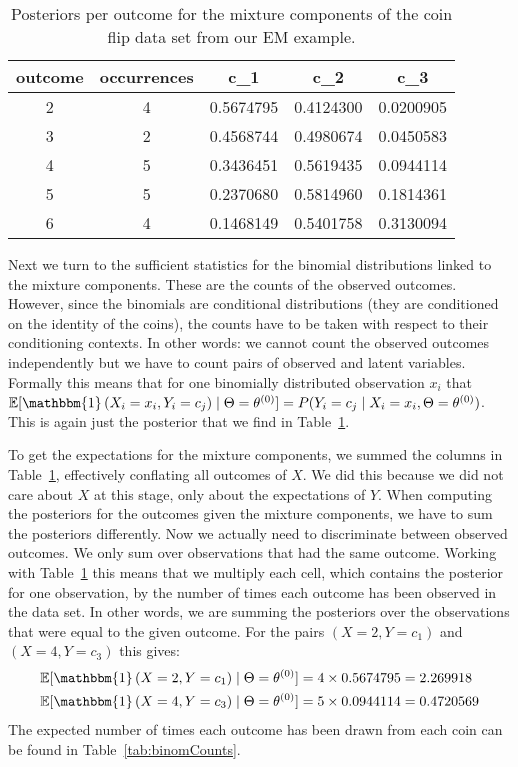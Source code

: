 \documentclass[a4paper,11pt,leqno]{report}\usepackage[]{graphicx}\usepackage[]{color}
\newcommand{\E}{\mathbb{E}}
\newcommand{\id}[1]{\mathbbm{1}\left(#1\right)}
\begin{document}
\begin{table}
\center

\begin{tabular}{c|c|c|c|c}
\hline
outcome & occurrences & c\_1 & c\_2 & c\_3\\
\hline
2 & 4 & 0.5674795 & 0.4124300 & 0.0200905\\
\hline
3 & 2 & 0.4568744 & 0.4980674 & 0.0450583\\
\hline
4 & 5 & 0.3436451 & 0.5619435 & 0.0944114\\
\hline
5 & 5 & 0.2370680 & 0.5814960 & 0.1814361\\
\hline
6 & 4 & 0.1468149 & 0.5401758 & 0.3130094\\
\hline
\end{tabular}


\caption{Posteriors per outcome for the mixture components of the coin flip data set from our EM example.}
\label{tab:posteriors}
\end{table}

Next we turn to the sufficient statistics for the binomial distributions linked to the mixture components. These are the counts of the observed outcomes. However,
since the binomials are conditional distributions (they are conditioned on the identity of the coins), the counts have to be taken with respect to their conditioning
contexts. In other words: we cannot count the observed outcomes independently but we have to count pairs of observed and latent variables. Formally this means that 
for one binomially distributed observation $ x_{i} $ that $ \E[\id{X_{i}=x_{i},Y_{i}=c_{j}} \mid \Theta=\theta^{(0)}] = P(Y_{i}=c_{j} \mid X_{i}=x_{i}, \Theta=\theta^{(0)}) $. This is again
just the posterior that we find in Table~\ref{tab:posteriors}. 

To get the expectations for the mixture components, we summed the columns in Table~\ref{tab:posteriors}, effectively conflating all outcomes of $ X $. We did this
because we did not care about $ X $ at this stage, only about the expectations of $ Y $. When computing the posteriors for the outcomes given the mixture components,
we have to sum the posteriors differently. Now we actually need to discriminate between
observed outcomes. We only sum over observations that had the same outcome. Working with Table~\ref{tab:posteriors} this means that we multiply each
cell, which contains the posterior for one observation, by the number of times each outcome has been observed in the data set. In other words, we are summing
the posteriors over the observations that were equal to the given outcome. For the pairs $ (X=2,Y=c_{1}) $
and $ (X=4,Y = c_{3}) $ this gives:
\begin{align}
\E[\id{X=2,Y=c_{1}} \mid \Theta=\theta^{(0)}] &= 4 \times 0.5674795 = 2.269918 \\
\E[\id{X=4,Y=c_{3}} \mid \Theta=\theta^{(0)}] &= 5 \times 0.0944114 = 0.4720569
\end{align} 
The expected number of times each outcome has been drawn from each coin can be found in Table~\ref{tab:binomCounts}. 
\end{document}
